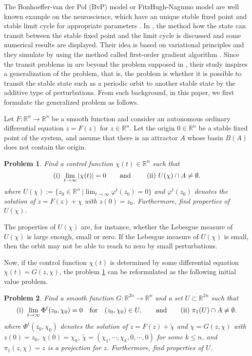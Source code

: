 \documentclass[11pt,reqno]{amsart}
\newtheorem{problem}{Problem}
\begin{document}
The Bonhoeffer-van der Pol (BvP) model or FitzHugh-Nagumo model are well known example on the neuroscience, which have an unique stable fixed point and stable limit cycle for appropriate parameters \cite{Barnes}. In \cite{Forger, Chang}, the method how the state can transit between the stable fixed point and the limit cycle is discussed and some numerical results are displayed. Their idea is based on variational principles and they simulate by using the method called first-order gradient algorithm \cite{Bryson}. Since the transit problems in \cite{Forger, Chang} are beyond the problem supposed in \cite{Brock}, their study inspires a generalization of the problem, that is, the problem is whether it is possible to transit the stable state such as a periodic orbit to another stable state by the additive type of perturbations. From such background, in this paper, we first formulate the generalized problem as follows.


Let $F:\mathbb{R}^n\to\mathbb{R}^n$ be a smooth function and consider an autonomous ordinary differential equation $\dot{z}=F(z)$ for $z\in\mathbb{R}^n$. Let the origin $0\in\mathbb{R}^n$ be a stable fixed point of the system, and assume that there is an attractor $A$ whose basin $B(A)$ does not contain the origin.


\begin{problem}\label{prob1}
Find a control function $\chi(t)\in\mathbb{R}^n$ such that
$$
{\rm(i)\ }\displaystyle\lim_{t\to\infty}|\chi(t)|=0\quad\quad {\rm and}
\quad \quad \ {\rm(ii)\ }U(\chi)\cap A \neq\emptyset.
$$
where $\displaystyle U(\chi):=\{z_0\in\mathbb{R}^n\ | \lim_{t\to\infty}\varphi^t(z_0)=0\}$ and $\varphi^t(z_0)$ denotes the solution of $\dot{z}=F(z)+\chi$ with $z(0)=z_0$. Furthermore, find properties of $U(\chi)$. 
\end{problem}
The properties of $U(\chi)$ are, for instance, whether the Lebesgue measure of $U(\chi)$ is large enough, small or zero. If the Lebesgue measure of $U(\chi)$ is small, then the orbit may not be able to reach to zero by small perturbations. 

Now, if the control function $\chi(t)$ is determined by some differential equation $\dot{\chi}(t)=G(z,\chi)$, the problem \ref{prob1} can be reformulated as the following initial value problem.

\begin{problem}\label{prob2}
Find a smooth function $G:\mathbb{R}^{2n}\to\mathbb{R}^n$ and a set $U\subset\mathbb{R}^{2n}$ such that 
$$
{\rm(i)\ }\lim_{t\to\infty}\Phi^t(z_0,\chi_0)=0
\quad {\rm for}\quad (z_0,\chi_0)\in U,
\quad\quad {\rm and}\quad \quad
{\rm(ii)\ } \pi_1(U) \cap A \neq\emptyset.
$$
where $\Phi^t(z_0,\chi_0)$ denotes the solution of $\dot{z}=F(z)+\tilde{\chi}$ and $\dot{\chi}=G(z,\chi)$ with $z(0)=z_0$, $\chi(0)=\chi_0$, $\tilde{\chi}=(\chi_1,\cdots,\chi_k,0,\cdots,0)$ for some $k\leq n$, and $\pi_1(z,\chi)=z$ is a projection for $z$. Furthermore, find properties of $U$. 
\end{problem} 
\end{document}
